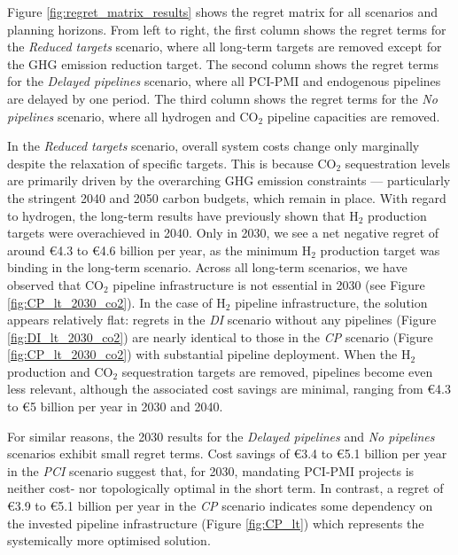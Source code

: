 \documentclass[pdflatex,sn-nature]{sn-jnl}%
\theoremstyle{thmstyleone}%
\theoremstyle{thmstyletwo}%
\theoremstyle{thmstylethree}%
\begin{document}
Figure \ref{fig:regret_matrix_results} shows the regret matrix for all scenarios and planning horizons. From left to right, the first column shows the regret terms for the \textit{Reduced targets} scenario, where all long-term targets are removed except for the GHG emission reduction target. The second column shows the regret terms for the \textit{Delayed pipelines} scenario, where all PCI-PMI and endogenous pipelines are delayed by one period. The third column shows the regret terms for the \textit{No pipelines} scenario, where all hydrogen and CO$_2$ pipeline capacities are removed.

In the \textit{Reduced targets} scenario, overall system costs change only marginally despite the relaxation of specific targets. This is because CO$_2$ sequestration levels are primarily driven by the overarching GHG emission constraints --- particularly the stringent 2040 and 2050 carbon budgets, which remain in place. With regard to hydrogen, the long-term results have previously shown that H$_2$ production targets were overachieved in 2040. Only in 2030, we see a net negative regret of around €4.3 to €4.6 billion per year, as the minimum H$_2$ production target was binding in the long-term scenario. Across all long-term scenarios, we have observed that CO$_2$
 pipeline infrastructure is not essential in 2030 (see Figure \ref{fig:CP_lt_2030_co2}). In the case of H$_2$ pipeline infrastructure, the solution appears relatively flat: regrets in the \textit{DI} scenario without any pipelines (Figure \ref{fig:DI_lt_2030_co2}) are nearly identical to those in the \textit{CP} scenario (Figure \ref{fig:CP_lt_2030_co2}) with substantial pipeline deployment. When the H$_2$ production and CO$_2$ sequestration targets are removed, pipelines become even less relevant, although the associated cost savings are minimal, ranging from €4.3 to €5 billion per year in 2030 and 2040.

For similar reasons, the 2030 results for the \textit{Delayed pipelines} and \textit{No pipelines} scenarios exhibit small regret terms. Cost savings of €3.4 to €5.1 billion per year in the \textit{PCI} scenario suggest that, for 2030, mandating PCI-PMI projects is neither cost- nor topologically optimal in the short term. In contrast, a regret of €3.9 to €5.1 billion per year in the \textit{CP} scenario indicates some dependency on the invested pipeline infrastructure (Figure \ref{fig:CP_lt}) which represents the systemically more optimised solution.
\end{document}
